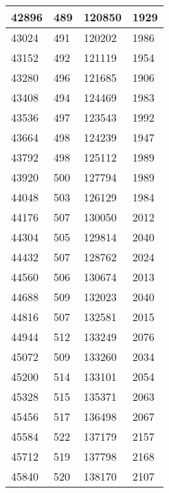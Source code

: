 \begin{longtable}{|l|l|l|l|}
		42896 & 489         & 120850          & 1929             \\ \hline
		43024 & 491         & 120202          & 1986             \\ \hline
		43152 & 492         & 121119          & 1954             \\ \hline
		43280 & 496         & 121685          & 1906             \\ \hline
		43408 & 494         & 124469          & 1983             \\ \hline
		43536 & 497         & 123543          & 1992             \\ \hline
		43664 & 498         & 124239          & 1947             \\ \hline
		43792 & 498         & 125112          & 1989             \\ \hline
		43920 & 500         & 127794          & 1989             \\ \hline
		44048 & 503         & 126129          & 1984             \\ \hline
		44176 & 507         & 130050          & 2012             \\ \hline
		44304 & 505         & 129814          & 2040             \\ \hline
		44432 & 507         & 128762          & 2024             \\ \hline
		44560 & 506         & 130674          & 2013             \\ \hline
		44688 & 509         & 132023          & 2040             \\ \hline
		44816 & 507         & 132581          & 2015             \\ \hline
		44944 & 512         & 133249          & 2076             \\ \hline
		45072 & 509         & 133260          & 2034             \\ \hline
		45200 & 514         & 133101          & 2054             \\ \hline
		45328 & 515         & 135371          & 2063             \\ \hline
		45456 & 517         & 136498          & 2067             \\ \hline
		45584 & 522         & 137179          & 2157             \\ \hline
		45712 & 519         & 137798          & 2168             \\ \hline
		45840 & 520         & 138170          & 2107             \\ \hline

\end{longtable}
